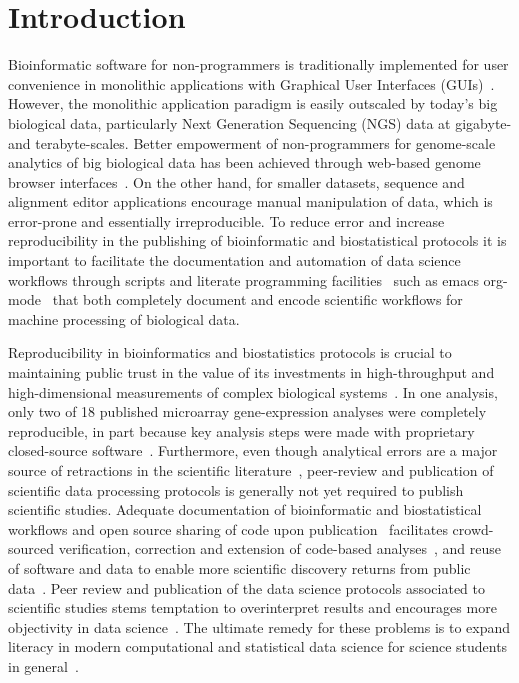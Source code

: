 \documentclass{frontiersSCNS} %
\begin{document}
\section{Introduction}

Bioinformatic software for non-programmers is traditionally
implemented for user convenience in monolithic applications with
Graphical User Interfaces
(GUIs)~\citep{Smith1994,stothard_sequence_2000,Rampp2006,
  Librado01062009,waterhouse_jalview_2009,gouy2010seaview}.  However,
the monolithic application paradigm is easily outscaled by today's big
biological data, particularly Next Generation Sequencing (NGS) data at
gigabyte- and terabyte-scales. Better empowerment of non-programmers
for genome-scale analytics of big biological data has been achieved
through web-based genome browser
interfaces~\citep{Cunningham28012015,Rosenbloom28012015,Markowitz01012014}. On
the other hand, for smaller datasets, sequence and alignment editor
applications encourage manual manipulation of data, which is
error-prone and essentially irreproducible. To reduce error and
increase reproducibility in the publishing of bioinformatic and
biostatistical protocols it is important to facilitate the
documentation and automation of data science workflows through scripts
and literate programming facilities~\citep{knuth1984literate} such as
emacs org-mode~\citep{delescluse_making_2012} that both completely
document and encode scientific workflows for machine processing of
biological data.

Reproducibility in bioinformatics and biostatistics protocols is
crucial to maintaining public trust in the value of its investments in
high-throughput and high-dimensional measurements of complex
biological
systems~\citep{BaggerlyCoombes2009,hutson2010data,Baggerly01052011,Huang01072013}.
In one analysis, only two of 18 published microarray gene-expression
analyses were completely reproducible, in part because key analysis
steps were made with proprietary closed-source
software~\citep{Ioannidis:2008cr}. Furthermore, even though analytical
errors are a major source of retractions in the scientific
literature~\citep{Casadevall01092014}, peer-review and publication of
scientific data processing protocols is generally not yet required to
publish scientific studies.  Adequate documentation of bioinformatic
and biostatistical workflows and open source sharing of code upon
publication~\citep{Peng01072009} facilitates crowd-sourced
verification, correction and extension of code-based
analyses~\citep{barnes2010publish,Morin13042012}, and reuse of
software and data to enable more scientific discovery returns from
public data~\citep{Peng02122011}. Peer review and publication of the
data science protocols associated to scientific studies stems
temptation to overinterpret results and encourages more objectivity in
data science~\citep{Boulesteix01022010}. The ultimate remedy for these
problems is to expand literacy in modern computational and statistical
data science for science students in
general~\citep{Morin13042012,Joppa17052013}.
\end{document}
